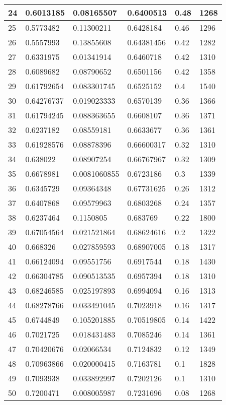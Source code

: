 \begin{longtable}{|l|l|l|l|l|l|}
24 & 0.6013185 & 0.08165507 & 0.6400513 & 0.48 & 1268 \\ \hline 
25 & 0.5773482 & 0.11300211 & 0.6428184 & 0.46 & 1296 \\ \hline 
26 & 0.5557993 & 0.13855608 & 0.64381456 & 0.42 & 1282 \\ \hline 
27 & 0.6331975 & 0.01341914 & 0.6460718 & 0.42 & 1310 \\ \hline 
28 & 0.6089682 & 0.08790652 & 0.6501156 & 0.42 & 1358 \\ \hline 
29 & 0.61792654 & 0.083301745 & 0.6525152 & 0.4 & 1540 \\ \hline 
30 & 0.64276737 & 0.019023333 & 0.6570139 & 0.36 & 1366 \\ \hline 
31 & 0.61794245 & 0.088363655 & 0.6608107 & 0.36 & 1371 \\ \hline 
32 & 0.6237182 & 0.08559181 & 0.6633677 & 0.36 & 1361 \\ \hline 
33 & 0.61928576 & 0.08878396 & 0.66600317 & 0.32 & 1310 \\ \hline 
34 & 0.638022 & 0.08907254 & 0.66767967 & 0.32 & 1309 \\ \hline 
35 & 0.6678981 & 0.0081060855 & 0.6723186 & 0.3 & 1339 \\ \hline 
36 & 0.6345729 & 0.09364348 & 0.67731625 & 0.26 & 1312 \\ \hline 
37 & 0.6407868 & 0.09579963 & 0.6803268 & 0.24 & 1357 \\ \hline 
38 & 0.6237464 & 0.1150805 & 0.683769 & 0.22 & 1800 \\ \hline 
39 & 0.67054564 & 0.021521864 & 0.68624616 & 0.2 & 1322 \\ \hline 
40 & 0.668326 & 0.027859593 & 0.68907005 & 0.18 & 1317 \\ \hline 
41 & 0.66124094 & 0.09551756 & 0.6917544 & 0.18 & 1430 \\ \hline 
42 & 0.66304785 & 0.090513535 & 0.6957394 & 0.18 & 1310 \\ \hline 
43 & 0.68246585 & 0.025197893 & 0.6994094 & 0.16 & 1313 \\ \hline 
44 & 0.68278766 & 0.033491045 & 0.7023918 & 0.16 & 1317 \\ \hline 
45 & 0.6744849 & 0.105201885 & 0.70519805 & 0.14 & 1422 \\ \hline 
46 & 0.7021725 & 0.018431483 & 0.7085246 & 0.14 & 1361 \\ \hline 
47 & 0.70420676 & 0.02066534 & 0.7124832 & 0.12 & 1349 \\ \hline 
48 & 0.70963866 & 0.020000415 & 0.7163781 & 0.1 & 1828 \\ \hline 
49 & 0.7093938 & 0.033892997 & 0.7202126 & 0.1 & 1310 \\ \hline 
50 & 0.7200471 & 0.008005987 & 0.7231696 & 0.08 & 1268 \\ \hline 
\end{longtable}